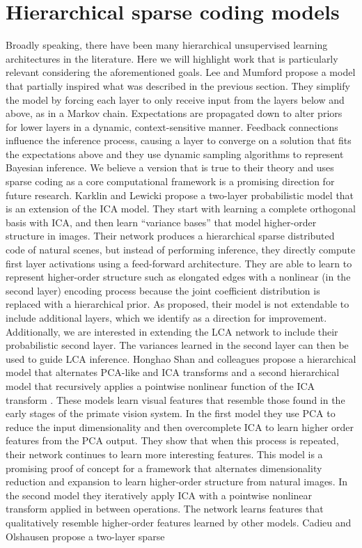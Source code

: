 \section{Hierarchical sparse coding models}\label{sec:ch3_related_models}
Broadly speaking, there have been many hierarchical unsupervised learning architectures in the literature. Here we will highlight work that is particularly relevant considering the aforementioned goals. Lee and Mumford \citeyearpar{lee2003hierarchical} propose a model that partially inspired what was described in the previous section. They simplify the model by forcing each layer to only receive input from the layers below and above, as in a Markov chain. Expectations are propagated down to alter priors for lower layers in a dynamic, context-sensitive manner. Feedback connections influence the inference process, causing a layer to converge on a solution that fits the expectations above and they use dynamic sampling algorithms to represent Bayesian inference. We believe a version that is true to their theory and uses sparse coding as a core computational framework is a promising direction for future research. Karklin and Lewicki \citeyearpar{karklin2003learning} propose a two-layer probabilistic model that is an extension of the ICA model. They start with learning a complete orthogonal basis with ICA, and then learn ``variance bases'' that model higher-order structure in images. Their network produces a hierarchical sparse distributed code of natural scenes, but instead of performing inference, they directly compute first layer activations using a feed-forward architecture. They are able to learn to represent higher-order structure such as elongated edges with a nonlinear (in the second layer) encoding process because the joint coefficient distribution is replaced with a hierarchical prior. As proposed, their model is not extendable to include additional layers, which we identify as a direction for improvement. Additionally, we are interested in extending the LCA network to include their probabilistic second layer. The variances learned in the second layer can then be used to guide LCA inference. Honghao Shan and colleagues propose a hierarchical model that alternates PCA-like and ICA transforms \parencite{shan2013efficient} and a second hierarchical model that recursively applies a pointwise nonlinear function of the ICA transform \parencite{shan2007recursive}. These models learn visual features that resemble those found in the early stages of the primate vision system. In the first model they use PCA to reduce the input dimensionality and then overcomplete ICA \parencite{le2011ica} to learn higher order features from the PCA output. They show that when this process is repeated, their network continues to learn more interesting features. This model is a promising proof of concept for a framework that alternates dimensionality reduction and expansion to learn higher-order structure from natural images. In the second model they iteratively apply ICA with a pointwise nonlinear transform applied in between operations. The network learns features that qualitatively resemble higher-order features learned by other models. Cadieu and Olshausen \citeyearpar{cadieu2008learning} propose a two-layer sparse 